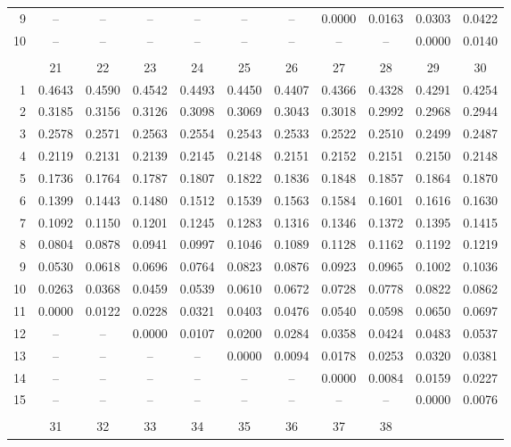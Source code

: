 \documentclass[draft]{article}
\begin{document}
\begin{table}
\begin{center}
\begin{tabular}{rcccccccccc}
 9&   -- &   -- &   -- &   -- &   -- &   -- &0.0000&0.0163&0.0303&0.0422\\
10&   -- &   -- &   -- &   -- &   -- &   -- &   -- &   -- &0.0000&0.0140\\
\\
  & \multicolumn{1}{c}{21} 
  & \multicolumn{1}{c}{22} 
  & \multicolumn{1}{c}{23} 
  & \multicolumn{1}{c}{24} 
  & \multicolumn{1}{c}{25} 
  & \multicolumn{1}{c}{26} 
  & \multicolumn{1}{c}{27} 
  & \multicolumn{1}{c}{28} 
  & \multicolumn{1}{c}{29} 
  & \multicolumn{1}{c}{30} \\ \cline{2-11}
 1&0.4643&0.4590&0.4542&0.4493&0.4450&0.4407&0.4366&0.4328&0.4291&0.4254\\
 2&0.3185&0.3156&0.3126&0.3098&0.3069&0.3043&0.3018&0.2992&0.2968&0.2944\\
 3&0.2578&0.2571&0.2563&0.2554&0.2543&0.2533&0.2522&0.2510&0.2499&0.2487\\
 4&0.2119&0.2131&0.2139&0.2145&0.2148&0.2151&0.2152&0.2151&0.2150&0.2148\\
 5&0.1736&0.1764&0.1787&0.1807&0.1822&0.1836&0.1848&0.1857&0.1864&0.1870\\
 6&0.1399&0.1443&0.1480&0.1512&0.1539&0.1563&0.1584&0.1601&0.1616&0.1630\\
 7&0.1092&0.1150&0.1201&0.1245&0.1283&0.1316&0.1346&0.1372&0.1395&0.1415\\
 8&0.0804&0.0878&0.0941&0.0997&0.1046&0.1089&0.1128&0.1162&0.1192&0.1219\\
 9&0.0530&0.0618&0.0696&0.0764&0.0823&0.0876&0.0923&0.0965&0.1002&0.1036\\
10&0.0263&0.0368&0.0459&0.0539&0.0610&0.0672&0.0728&0.0778&0.0822&0.0862\\
11&0.0000&0.0122&0.0228&0.0321&0.0403&0.0476&0.0540&0.0598&0.0650&0.0697\\
12&  --  &  --  &0.0000&0.0107&0.0200&0.0284&0.0358&0.0424&0.0483&0.0537\\
13&  --  &  --  &  --  &  --  &0.0000&0.0094&0.0178&0.0253&0.0320&0.0381\\
14&  --  &  --  &  --  &  --  &  --  &  --  &0.0000&0.0084&0.0159&0.0227\\
15&  --  &  --  &  --  &  --  &  --  &  --  &  --  &  --  &0.0000&0.0076\\
\\
  & \multicolumn{1}{c}{31} 
  & \multicolumn{1}{c}{32} 
  & \multicolumn{1}{c}{33} 
  & \multicolumn{1}{c}{34} 
  & \multicolumn{1}{c}{35} 
  & \multicolumn{1}{c}{36} 
  & \multicolumn{1}{c}{37} 
  & \multicolumn{1}{c}{38} 

\end{tabular}
\end{center}
\end{table}
\end{document}
